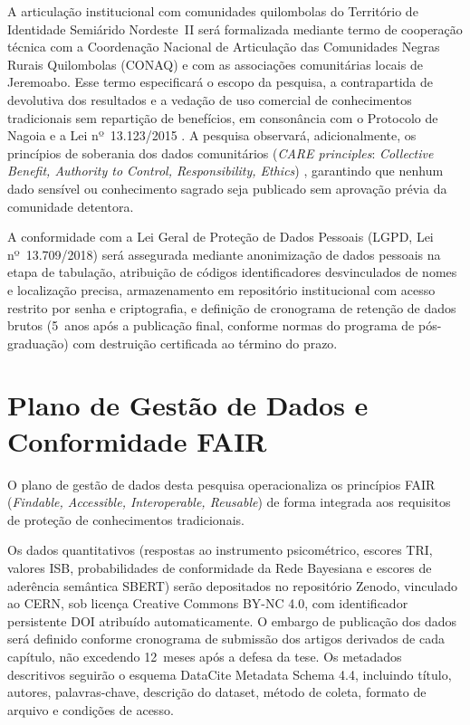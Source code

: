 A articulação institucional com comunidades quilombolas do Território de Identidade Semiárido Nordeste~II será formalizada mediante termo de cooperação técnica com a Coordenação Nacional de Articulação das Comunidades Negras Rurais Quilombolas (CONAQ) e com as associações comunitárias locais de Jeremoabo. Esse termo especificará o escopo da pesquisa, a contrapartida de devolutiva dos resultados e a vedação de uso comercial de conhecimentos tradicionais sem repartição de benefícios, em consonância com o Protocolo de Nagoia e a Lei nº~13.123/2015 \cite{Brasil2015}. A pesquisa observará, adicionalmente, os princípios de soberania dos dados comunitários (\textit{CARE principles}: \textit{Collective Benefit, Authority to Control, Responsibility, Ethics}) \cite{Carroll2020}, garantindo que nenhum dado sensível ou conhecimento sagrado seja publicado sem aprovação prévia da comunidade detentora.

A conformidade com a Lei Geral de Proteção de Dados Pessoais (LGPD, Lei nº~13.709/2018) será assegurada mediante anonimização de dados pessoais na etapa de tabulação, atribuição de códigos identificadores desvinculados de nomes e localização precisa, armazenamento em repositório institucional com acesso restrito por senha e criptografia, e definição de cronograma de retenção de dados brutos (5~anos após a publicação final, conforme normas do programa de pós-graduação) com destruição certificada ao término do prazo.


\section{Plano de Gestão de Dados e Conformidade FAIR}
\label{sec:fair_geral}

O plano de gestão de dados desta pesquisa operacionaliza os princípios FAIR (\textit{Findable, Accessible, Interoperable, Reusable}) \cite{Wilkinson2016} de forma integrada aos requisitos de proteção de conhecimentos tradicionais.

Os dados quantitativos (respostas ao instrumento psicométrico, escores TRI, valores ISB, probabilidades de conformidade da Rede Bayesiana e escores de aderência semântica SBERT) serão depositados no repositório Zenodo, vinculado ao CERN, sob licença Creative Commons BY-NC 4.0, com identificador persistente DOI atribuído automaticamente. O embargo de publicação dos dados será definido conforme cronograma de submissão dos artigos derivados de cada capítulo, não excedendo 12~meses após a defesa da tese. Os metadados descritivos seguirão o esquema DataCite Metadata Schema 4.4, incluindo título, autores, palavras-chave, descrição do dataset, método de coleta, formato de arquivo e condições de acesso.

